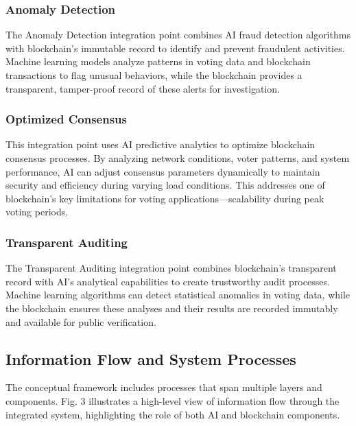 \documentclass[conference]{IEEEtran}
\begin{document}
\subsubsection{Anomaly Detection}
The Anomaly Detection integration point combines AI fraud detection algorithms with blockchain's immutable record to identify and prevent fraudulent activities. Machine learning models analyze patterns in voting data and blockchain transactions to flag unusual behaviors, while the blockchain provides a transparent, tamper-proof record of these alerts for investigation.

\subsubsection{Optimized Consensus}
This integration point uses AI predictive analytics to optimize blockchain consensus processes. By analyzing network conditions, voter patterns, and system performance, AI can adjust consensus parameters dynamically to maintain security and efficiency during varying load conditions. This addresses one of blockchain's key limitations for voting applications—scalability during peak voting periods.

\subsubsection{Transparent Auditing}
The Transparent Auditing integration point combines blockchain's transparent record with AI's analytical capabilities to create trustworthy audit processes. Machine learning algorithms can detect statistical anomalies in voting data, while the blockchain ensures these analyses and their results are recorded immutably and available for public verification.

\subsection{Information Flow and System Processes}
The conceptual framework includes processes that span multiple layers and components. Fig. 3 illustrates a high-level view of information flow through the integrated system, highlighting the role of both AI and blockchain components.
\end{document}
